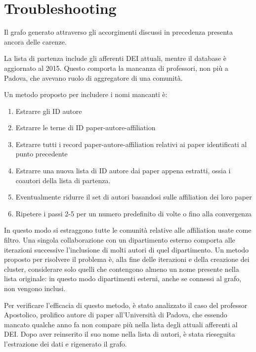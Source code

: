 \documentclass[12pt,a4paper,twoside]{report}
\begin{document}
\whitePage
\chapter{Troubleshooting} \label{cap:trouble}
Il grafo generato attraverso gli accorgimenti discussi in precedenza presenta ancora delle carenze.


La lista di partenza include gli afferenti DEI attuali, mentre il database è aggiornato al 2015.
Questo comporta la mancanza di professori, non più a Padova, che avevano ruolo di aggregatore di una
comunità.

Un metodo proposto per includere i nomi mancanti è:
\begin{enumerate}[noitemsep, topsep=0pt]
\item
Estrarre gli ID autore
\item
Estrarre le terne di ID paper-autore-affiliation
\item
Estrarre tutti i record paper-autore-affiliation relativi ai paper identificati al punto precedente
\item
Estrarre una nuova lista di ID autore dai paper appena estratti, ossia i coautori della lista di
partenza.
\item
Eventualmente ridurre il set di autori basandosi sulle affiliation dei loro paper
\item
Ripetere i passi 2-5 per un numero predefinito di volte o fino alla convergenza
\end{enumerate}

In questo modo si estraggono tutte le comunità relative alle affiliation usate come filtro. Una
singola collaborazione con un dipartimento esterno comporta alle iterazioni successive l'inclusione
di molti autori di quel dipartimento. Un metodo proposto per risolvere il problema è, alla fine delle
iterazioni e della creazione dei cluster, considerare solo quelli che contengono almeno un nome
presente nella lista originale: in questo modo dipartimenti esterni, anche se connessi al grafo, non
vengono inclusi.

Per verificare l'efficacia di questo metodo, è stato analizzato il caso del professor Apostolico,
prolifico autore di paper all'Università di Padova, che essendo mancato qualche anno fa non compare
più nella lista degli attuali afferenti al DEI. Dopo aver reinserito il suo nome nella lista di
autori, è stata rieseguita l'estrazione dei dati e rigenerato il grafo.
\end{document}
